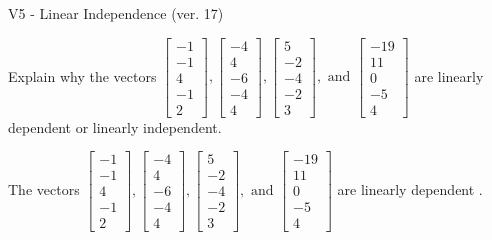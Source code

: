 \begin{exercise}
  \begin{exerciseTitle}V5 - Linear Independence (ver. 17)\end{exerciseTitle}
  \begin{exerciseStatement}
    Explain why the vectors \(\left[\begin{array}{r}
-1 \\
-1 \\
4 \\
-1 \\
2
\end{array}\right] , \left[\begin{array}{r}
-4 \\
4 \\
-6 \\
-4 \\
4
\end{array}\right] , \left[\begin{array}{r}
5 \\
-2 \\
-4 \\
-2 \\
3
\end{array}\right] , \text{ and } \left[\begin{array}{r}
-19 \\
11 \\
0 \\
-5 \\
4
\end{array}\right]\) are linearly dependent or linearly independent.	


  \end{exerciseStatement}
  \begin{exerciseAnswer}
   The vectors \(\left[\begin{array}{r}
-1 \\
-1 \\
4 \\
-1 \\
2
\end{array}\right] , \left[\begin{array}{r}
-4 \\
4 \\
-6 \\
-4 \\
4
\end{array}\right] , \left[\begin{array}{r}
5 \\
-2 \\
-4 \\
-2 \\
3
\end{array}\right] , \text{ and } \left[\begin{array}{r}
-19 \\
11 \\
0 \\
-5 \\
4
\end{array}\right]\) are 
  	 linearly dependent  .
  


  \end{exerciseAnswer}
\end{exercise}